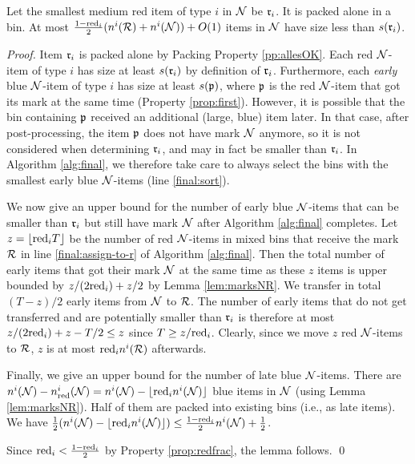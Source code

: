 \begin{lemma}
\label{lem:smallestred1}
Let the smallest medium red item of type $i$ in $\mathcal{N}$ be $\mathfrak{r}_i$. 
It is packed alone in a bin.
At most $\frac{1-\mathrm{red}_i}2 (n^i(\mathcal{R})+n^i(\mathcal{N}))
+O(1) $
items in $\mathcal{N}$ have size less than $s(\mathfrak{r}_i)$.
\end{lemma}
\begin{proof}
Item $\mathfrak{r}_i$ is packed alone by Packing Property \ref{pp:allesOK}.
Each red $\mathcal{N}$-item of type $i$ has size at least $s(\mathfrak{r}_i)$ by definition of $\mathfrak{r}_i$.
Furthermore, each \emph{early} blue $\mathcal{N}$-item of type $i$ has size at least $s(\mathfrak{p})$, where
$\mathfrak{p}$ is the red $\mathcal{N}$-item that got its mark at the same time (Property \ref{prop:first}).
However, it is possible that the bin containing $\mathfrak{p}$ received an additional (large, blue) item later.
In that case, after post-processing, the item $\mathfrak{p}$ does not have mark $\mathcal{N}$ anymore,
so it is not considered when determining $\mathfrak{r}_i$, and may in fact be smaller than $\mathfrak{r}_i$.
In Algorithm \ref{alg:final}, we therefore take care to always select the bins with
the smallest early blue $\mathcal{N}$-items (line \ref{final:sort}). 

We now give an upper bound for the number of early blue $\mathcal{N}$-items that can be smaller than $\mathfrak{r}_i$ but still have mark $\mathcal{N}$ after Algorithm \ref{alg:final} completes.
Let $z = \lfloor \mathrm{red}_i T \rfloor$ be the number of red $\mathcal{N}$-items in mixed bins
that receive the mark $\mathcal{R}$ in line \ref{final:assign-to-r} of Algorithm \ref{alg:final}.
Then the total number of early items that got their mark $\mathcal{N}$ at the same time as these
$z$ items is upper bounded by $z/(2\mathrm{red}_i) + z/2$ by Lemma \ref{lem:marksNR}.
We transfer in total $(T-z)/2$ early items from $\mathcal{N}$ to $\mathcal{R}$.
The number of early items that do not get transferred and are potentially smaller than $\mathfrak{r}_i$
is therefore at most  $z/(2\mathrm{red}_i) + z -T/2 \le z$ since $T\ge z/\mathrm{red}_i$.
Clearly, since we move $z$ red $\mathcal{N}$-items to $\mathcal{R}$,
$z$ is at most $\mathrm{red}_in^i(\mathcal{R})$ afterwards.

Finally, we give an upper bound for the number of late blue $\mathcal{N}$-items.
There are $n^i(\mathcal{N}) - n_{\mathrm{red}}^i(\mathcal{N}) =
n^i(\mathcal{N}) - \lfloor \mathrm{red}_i n^i(\mathcal{N})\rfloor$ blue items in $\mathcal{N}$ (using Lemma \ref{lem:marksNR}).
Half of them are packed into existing bins (i.e., as late items).
We have $\frac12 (n^i(\mathcal{N}) - \lfloor \mathrm{red}_i n^i(\mathcal{N})\rfloor) \le \frac{1-\mathrm{red}_i}2 n^i(\mathcal{N}) +\frac12$.

Since $\mathrm{red}_i < \frac{1-\mathrm{red}_i}2$ by Property \ref{prop:redfrac}, the lemma follows.
\qed\end{proof}



